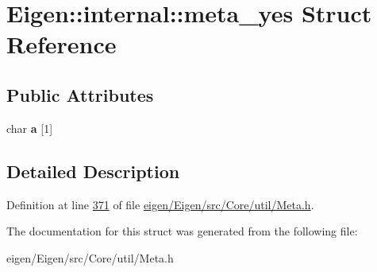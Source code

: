 \hypertarget{struct_eigen_1_1internal_1_1meta__yes}{}\section{Eigen\+:\+:internal\+:\+:meta\+\_\+yes Struct Reference}
\label{struct_eigen_1_1internal_1_1meta__yes}
\subsection*{Public Attributes}
\begin{DoxyCompactItemize}
\item 
\mbox{\label{struct_eigen_1_1internal_1_1meta__yes_af33e79672097379a9d78fd9d19acadf3}} 
char {\bfseries a} \mbox{[}1\mbox{]}
\end{DoxyCompactItemize}


\subsection{Detailed Description}


Definition at line \hyperlink{eigen_2_eigen_2src_2_core_2util_2_meta_8h_source_l00371}{371} of file \hyperlink{eigen_2_eigen_2src_2_core_2util_2_meta_8h_source}{eigen/\+Eigen/src/\+Core/util/\+Meta.\+h}.



The documentation for this struct was generated from the following file\+:\begin{DoxyCompactItemize}
\item 
eigen/\+Eigen/src/\+Core/util/\+Meta.\+h\end{DoxyCompactItemize}
